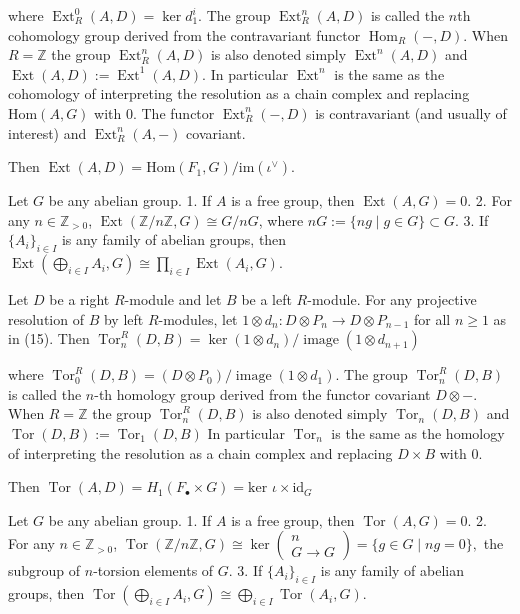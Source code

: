 where \( \operatorname{Ext}_R^0(A, D) = \ker d_1^i \). The group \( \operatorname{Ext}_R^n(A, D) \) is called the \( n \)\-th 
cohomology group derived from the contravariant functor \( \operatorname{Hom}_R(-, D) \). 
When \(R = \mathbb{Z}\) the group \( \operatorname{Ext}_R^n(A, D) \) 
is also denoted simply \(\operatorname{Ext}^n(A, D)\) and \(\operatorname{Ext}(A, D) := \operatorname{Ext}^1(A, D)\).
In particular \( \operatorname{Ext}^n \) is the same as the cohomology of interpreting the resolution as a chain complex and replacing 
\( \text{Hom}(A, G) \) with \( 0 \). The functor \( \operatorname{Ext}_R^n(-, D) \) is contravariant (and usually of interest) and 
\( \operatorname{Ext}_R^n(A, -) \) covariant.

Then \( \operatorname{Ext}(A, D) = \text{Hom}(F_1, G) / \text{im}(\iota^\vee) \).

Let \(G\) be any abelian group.
1. If \(A\) is a free group, then \(\operatorname{Ext}(A, G) = 0\). 
2. For any \(n \in \mathbb{Z}_{>0}\), \(\operatorname{Ext}(\mathbb{Z}/n\mathbb{Z}, G) \cong G/nG\), where \(nG := \{ng \mid g \in G\} \subset G\).
3. If \(\{A_i\}_{i \in I}\) is any family of abelian groups, then \(\operatorname{Ext}\left( \bigoplus_{i \in I} A_i, G \right) \cong \prod_{i \in I} \operatorname{Ext}(A_i, G)\).


Let \(D\) be a right \(R\)-module and let \(B\) be a left \(R\)-module. For any projective resolution of \(B\) by left \(R\)-modules, let 
\(
1 \otimes d_n : D \otimes P_n \to D \otimes P_{n-1} 
\)
for all \(n \geq 1\) as in (15). Then
\(
\operatorname{Tor}_n^R(D, B) = \ker(1 \otimes d_n) / \operatorname{image}(1 \otimes d_{n+1})
\)

where \( \operatorname{Tor}_0^R(D, B) = (D \otimes P_0) / \operatorname{image}(1 \otimes d_1) \). 
The group \( \operatorname{Tor}_n^R(D, B) \) is called the \( n \)-th homology group derived from the functor covariant \(D \otimes - \). 
When \(R = \mathbb{Z}\) the group \(\operatorname{Tor}_n^R(D, B)\) is also denoted simply \(\operatorname{Tor}_n(D, B)\) and
\(\operatorname{Tor}(D, B) := \operatorname{Tor}_1(D, B)\)
In particular \( \operatorname{Tor}_n \) is the same as the homology of interpreting the resolution as a chain complex and replacing 
\( D \times B \) with \( 0 \).


Then \( \operatorname{Tor}(A, D) = H_1(F_\bullet \times G) = \text{ker }\iota \times \text{id}_G \)

Let \(G\) be any abelian group.
1. If \(A\) is a free group, then \(\operatorname{Tor}(A, G) = 0\). 
2. For any \(n \in \mathbb{Z}_{>0}\), 
\(\operatorname{Tor}(\mathbb{Z}/n\mathbb{Z}, G) \cong \ker \left( \begin{array}{c} n \\ G \longrightarrow G \end{array} \right) = \{g \in G \mid ng = 0\},\)
the subgroup of \(n\)-torsion elements of \(G\).
3. If \(\{A_i\}_{i \in I}\) is any family of abelian groups, then 
\(\operatorname{Tor}\left( \bigoplus_{i \in I} A_i, G \right) \cong \bigoplus_{i \in I} \operatorname{Tor}(A_i, G). \)

